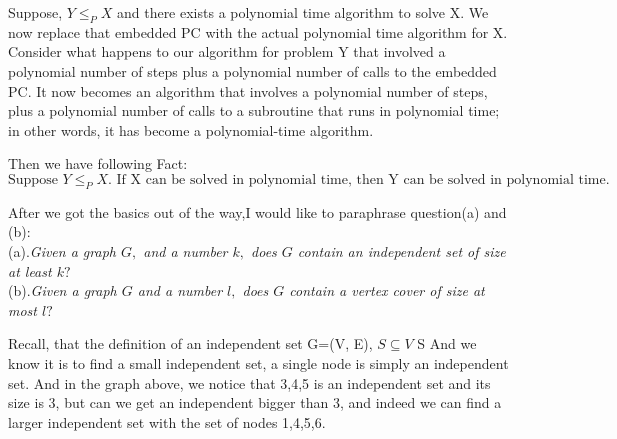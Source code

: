 \documentclass{article}
\begin{document}
Suppose, $Y \leq_{P} X$ and there exists a polynomial time algorithm to solve X. We now replace that embedded PC with the actual polynomial time algorithm for X. Consider what happens to our algorithm for problem Y that involved a polynomial number of steps plus a polynomial number of calls to the embedded PC. It now becomes an algorithm that involves a polynomial number of steps, plus a polynomial number of calls to a subroutine that runs in polynomial time; in other words, it has become a polynomial-time algorithm.

Then we have following Fact: 
\begin{equation}
    \text{Suppose  $Y \leq_{P}X$. If X can be solved in polynomial time, then Y can be solved in polynomial time.}
\end{equation}

After we got the basics out of the way,I would like to paraphrase question(a) and (b):\\
(a).\textit{Given a graph \(G,\) and a number \(k,\) does \(G\) contain an independent set of size at least \(k ?\)} \\
(b).\textit{Given a graph \(G\) and a number \(l,\) does \(G\) contain a vertex cover of size at most \(l ?\)} \\

\begin{center}
\end{center}
Recall, that the definition of an independent set 
{ G=(V, E), }{$S\subseteq V$  S } And we know it is to find a small independent set, a single node is simply an independent set. And in the graph above, we notice that {3,4,5} is an independent set and its size is 3, but can we get an independent bigger than 3, and indeed we can find a larger independent set with the set of nodes {1,4,5,6}. 
\end{document}
